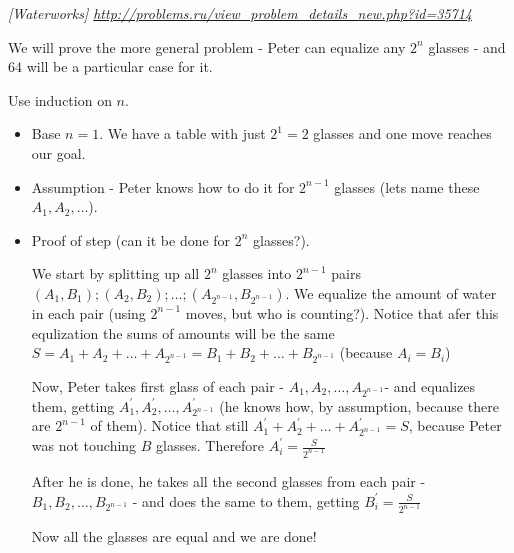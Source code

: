 \begin{problem}
\textit{[Waterworks] \url{http://problems.ru/view_problem_details_new.php?id=35714}}

We will prove the more general problem - Peter can equalize any $2^n$ glasses - and $64$ will be a particular case for it.

Use induction on $n$. 
\begin{itemize}
\item Base $n=1$. We have a table with just $2^1=2$ glasses and one move reaches our goal.
\item Assumption - Peter knows how to do it for $2^{n-1}$ glasses (lets name these $A_1, A_2, \dots$).
\item Proof of step (can it be done for $2^n$ glasses?).

We start by splitting up all $2^n$ glasses into $2^{n-1}$ pairs $(A_1,B_1);(A_2,B_2);\dots;(A_{2^{n-1}},B_{2^{n-1}})$. We equalize the amount of water in each pair (using $2^{n-1}$ moves, but who is counting?). Notice that afer this equlization the sums of amounts will be the same $S=A_1+A_2+\dots+A_{2^{n-1}}=B_1+B_2+\dots+B_{2^{n-1}}$  (because $A_i=B_i$)

Now, Peter takes first glass of each pair - $A_1, A_2, \dots, A_{2^{n-1}}$- and equalizes them, getting $A_1^\prime, A_2^\prime, \dots, A_{2^{n-1}}^\prime$ (he knows how, by assumption, because there are $2^{n-1}$ of them). Notice that still $A_1^\prime+A_2^\prime+\dots+A_{2^{n-1}}^\prime=S$, because Peter was not touching $B$ glasses. Therefore $A_i^\prime=\frac{S}{2^{n-1}}$

After he is done, he takes all the second glasses from each pair - $B_1, B_2, \dots, B_{2^{n-1}}$ - and does the same to them, getting $B_i^\prime=\frac{S}{2^{n-1}}$

Now all the glasses are equal and we are done!
\end{itemize}
\end{problem}

